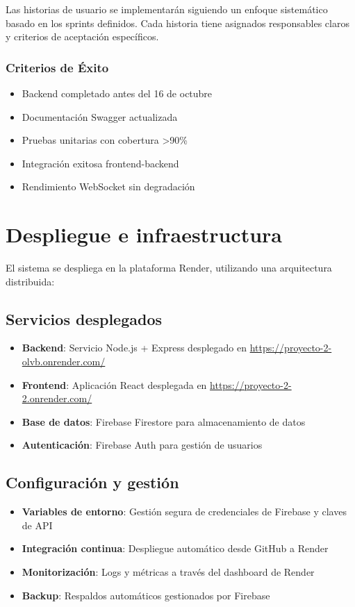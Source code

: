 \documentclass[12pt]{article}
\begin{document}
Las historias de usuario se implementarán siguiendo un enfoque sistemático basado en los sprints definidos. Cada historia tiene asignados responsables claros y criterios de aceptación específicos.

\subsubsection{Criterios de Éxito}
\begin{itemize}
    \item Backend completado antes del 16 de octubre
    \item Documentación Swagger actualizada
    \item Pruebas unitarias con cobertura >90\%
    \item Integración exitosa frontend-backend
    \item Rendimiento WebSocket sin degradación
\end{itemize}




\section{Despliegue e infraestructura}
El sistema se despliega en la plataforma Render, utilizando una arquitectura distribuida:

\subsection{Servicios desplegados}
\begin{itemize}
    \item \textbf{Backend}: Servicio Node.js + Express desplegado en \url{https://proyecto-2-olvb.onrender.com/}
    \item \textbf{Frontend}: Aplicación React desplegada en \url{https://proyecto-2-2.onrender.com/}
    \item \textbf{Base de datos}: Firebase Firestore para almacenamiento de datos
    \item \textbf{Autenticación}: Firebase Auth para gestión de usuarios
\end{itemize}

\subsection{Configuración y gestión}
\begin{itemize}
    \item \textbf{Variables de entorno}: Gestión segura de credenciales de Firebase y claves de API
    \item \textbf{Integración continua}: Despliegue automático desde GitHub a Render
    \item \textbf{Monitorización}: Logs y métricas a través del dashboard de Render
    \item \textbf{Backup}: Respaldos automáticos gestionados por Firebase
\end{itemize}
\end{document}
